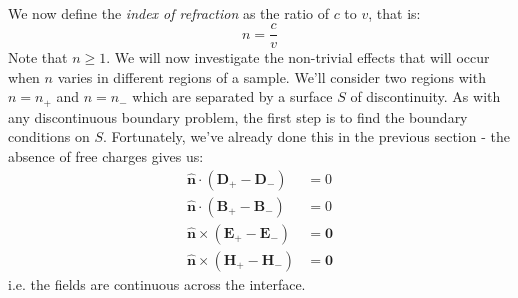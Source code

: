 \documentclass[a4paper]{article}
\numberwithin{equation}{section}
\begin{document}
\\
We now define the \textit{index of refraction} as the ratio of $c$ to $v$, that is:
\begin{equation}
n= \frac{c}{v}
\end{equation}
Note that $n \geq 1$. We will now investigate the non-trivial effects that will occur when $n$ varies in different regions of a sample. We'll consider two regions with $n=n_+$ and $n=n_-$ which are separated by a surface $S$ of discontinuity. As with any discontinuous boundary problem, the first step is to find the boundary conditions on $S$. Fortunately, we've already done this in the previous section - the absence of free charges gives us:
\begin{align}
\hat{\mathbf{n}} \cdot (\mathbf{D}_+ - \mathbf{D}_-) &= 0 \label{bc1} \\
\hat{\mathbf{n}} \cdot (\mathbf{B}_+ - \mathbf{B}_-) &= 0 \label{bc2} \\ 
\hat{\mathbf{n}} \times (\mathbf{E}_+ - \mathbf{E}_-)&= \mathbf{0} \label{bc3} \\
\hat{\mathbf{n}} \times (\mathbf{H}_+ - \mathbf{H}_-)&= \mathbf{0} \label{bc4}
\end{align}
i.e. the fields are continuous across the interface.
\end{document}

